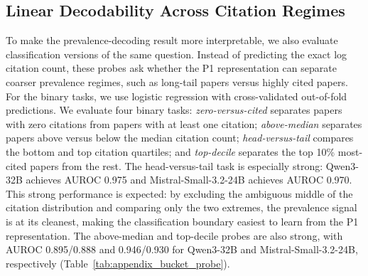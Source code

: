 \documentclass[11pt]{article}
\begin{document}
\subsection{Linear Decodability Across Citation Regimes}

To make the prevalence-decoding result more interpretable, we also evaluate
classification versions of the same question.  Instead of predicting the exact
log citation count, these probes ask whether the P1 representation can separate
coarser prevalence regimes, such as long-tail papers versus highly cited papers.
For the binary tasks, we use logistic regression with cross-validated out-of-fold predictions.  We evaluate four binary tasks: \textit{zero-versus-cited}
separates papers with zero citations from papers with at least one citation;
\textit{above-median} separates papers above versus below the median citation count;
\textit{head-versus-tail} compares the bottom and top citation quartiles; and \textit{top-decile}
separates the top 10\% most-cited papers from the rest.
The head-versus-tail task is especially strong: Qwen3-32B achieves AUROC 0.975 and Mistral-Small-3.2-24B achieves AUROC 0.970. This strong performance is expected: by excluding the ambiguous middle of the citation distribution and comparing only the two extremes, the prevalence signal is at its cleanest, making the classification boundary easiest to learn from the P1 representation.
The above-median and top-decile probes are also strong, with AUROC 0.895/0.888
and 0.946/0.930 for Qwen3-32B and Mistral-Small-3.2-24B, respectively (Table~\ref{tab:appendix_bucket_probe}).

\setlength{\tabcolsep}{4pt}
\begin{table}[t]
\centering
\footnotesize
{}
\caption{Citation-prevalence classification from P1 hidden states. The
head-versus-tail task compares papers below the first citation quartile with
papers above the third citation quartile.}
\label{tab:appendix_bucket_probe}
\end{table}
\end{document}
